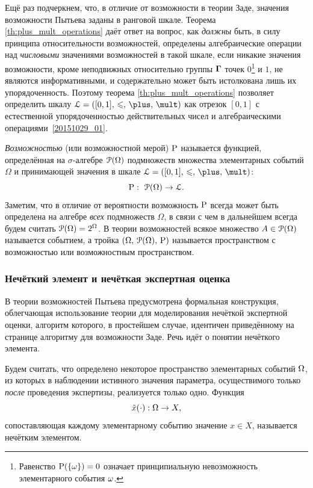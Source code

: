 Ещё раз подчеркнем, что, в отличие от возможности в теории Заде, значения возможности Пытьева заданы в ранговой шкале. Теорема \ref{th:plus_mult_operations} даёт ответ на вопрос, как \emph{должны} быть, в силу принципа относительности возможностей, определены алгебраические операции над \emph{числовыми} значениями возможностей в такой шкале, если никакие значения возможности, кроме неподвижных относительно группы $\bTheta$ точек $0$\footnote{Равенство $\P(\{\om\}) = 0$ означает принципиальную невозможность элементарного события $\om$.} и $1$, не являются информативными, и содержательно может быть истолкована лишь их упорядоченность. Поэтому теорема \ref{th:plus_mult_operations} позволяет определить шкалу $\scL=\scale$ как отрезок $[0,1]$ с естественной упорядоченностью действительных чисел и алгебраическими операциями~\eqref{20151029_01}.

\emph{Возможностью} (или возможностной мерой) $\P$ называется функцией, определённая на $\sigma$-алгебре $\Po(\Omega)$ подмножеств множества элементарных событий $\Omega$ и принимающей значения в шкале $\scL=\scale$:
\begin{equation*}
    \P:\ \Po(\Omega)\to\scL.
\end{equation*}
Заметим, что в отличие от вероятности возможность $\P$ всегда может быть определена на алгебре \emph{всех} подмножеств $\Omega$, в связи с чем в дальнейшем всегда будем считать $\Po(\Omega) = 2^\Omega$. В теории возможностей всякое множество $A\in\Po(\Omega)$ называется событием, а тройка $\OAP$ называется пространством с возможностью или возможностным пространством. 

\subsubsection{Нечёткий элемент и нечёткая экспертная оценка}

В теории возможностей Пытьева предусмотрена формальная конструкция, облегчающая использование теории для моделирования нечёткой экспертной оценки, алгоритм которого, в простейшем случае, идентичен приведённому на странице \pageref{zadeh_fuzzy_asset_alg} алгоритму для возможности Заде. Речь идёт о понятии нечёткого элемента.

Будем считать, что определено некоторое пространство элементарных событий $\Om$, из которых в наблюдении истинного значения параметра, осуществимого только \emph{после} проведения экспертизы, реализуется только одно. Функция
\begin{equation*}
	\tilde x(\cdot): \Om \rightarrow X,
\end{equation*} 
сопоставляющая каждому элементарному событию значение $x \in X$, называется нечётким элементом.  

